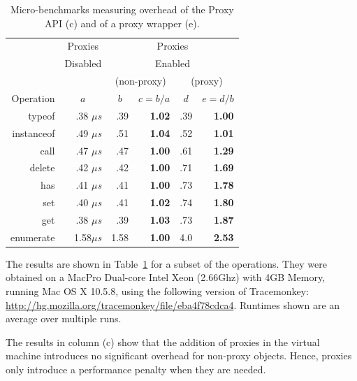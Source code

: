 \documentclass{sig-alternate}
\begin{document}
\begin{table}
  \begin{center}
  \begin{tabular}{r|r|r|r|r|r}
              & \multicolumn{1}{|c|}{Proxies} & \multicolumn{4}{|c}{Proxies}\\
              & \multicolumn{1}{|c|}{Disabled} & \multicolumn{4}{|c}{Enabled}\\
    \hline
           &   & \multicolumn{2}{|c|}{(non-proxy)} & \multicolumn{2}{|c}{(proxy)}\\
           \cline{3-6}
 Operation & \multicolumn{1}{|c|}{$a$} & \multicolumn{1}{|c|}{$b$} & \multicolumn{1}{|c|}{$c=b/a$} & \multicolumn{1}{|c|}{$d$} & \multicolumn{1}{|c}{$e=d/b$}\\
    \hline
    typeof     & ~.38 $\mu$\emph{s} & .39 & \textbf{1.02} & .39 & \textbf{1.00}\\
    instanceof & ~.49 $\mu$\emph{s} & .51 & \textbf{1.04} & .52 & \textbf{1.01}\\
    call       & ~.47 $\mu$\emph{s} & .47 & \textbf{1.00} & .61 & \textbf{1.29}\\
    delete     & ~.42 $\mu$\emph{s} & .42 & \textbf{1.00} & .71 & \textbf{1.69}\\
    has        & ~.41 $\mu$\emph{s} & .41 & \textbf{1.00} & .73 & \textbf{1.78}\\
    set        & ~.40 $\mu$\emph{s} & .41 & \textbf{1.02} & .74 & \textbf{1.80}\\
    get        & ~.38 $\mu$\emph{s} & .39 & \textbf{1.03} & .73 & \textbf{1.87}\\
    enumerate  & 1.58$\mu$\emph{s} & 1.58 & \textbf{1.00} & 4.0 & \textbf{2.53}\\
  \end{tabular}
  \end{center}
  \caption{Micro-benchmarks measuring overhead of the Proxy API (c) and of a proxy wrapper (e).}
  \label{tab:benchmarks}
\end{table}

The results are shown in Table~\ref{tab:benchmarks} for a subset of the operations. They were obtained on a MacPro Dual-core Intel Xeon (2.66Ghz) with 4GB Memory, running Mac OS X 10.5.8, using the following version of Tracemonkey: \url{http://hg.mozilla.org/tracemonkey/file/eba4f78cdca4}. Runtimes shown are an average over multiple runs.

The results in column (c) show that the addition of proxies in the virtual machine introduces no significant overhead for non-proxy objects. Hence, proxies only introduce a performance penalty when they are needed.
\end{document}
